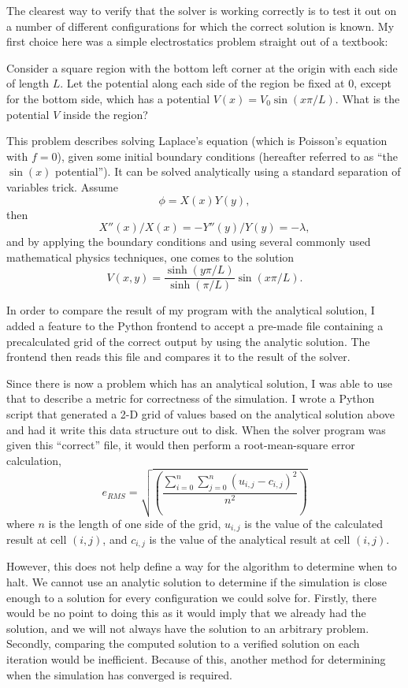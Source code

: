 The clearest way to verify that the solver is working correctly is to test it out on a number of different configurations
for which the correct solution is known. My first choice here was a simple electrostatics problem straight out of a textbook\cite{griffiths}:
\begin{addmargin}[2em]{2em}%
	Consider a square region with the bottom left corner at the origin with each side of length $L$. Let the potential
	along each side of the region be fixed at 0, except for the bottom side, which has a potential $V(x) = V_0 \sin(x \pi / L)$.
	What is the potential $V$ inside the region?
\end{addmargin}
This problem describes solving Laplace's equation (which is Poisson's equation with $f=0$), given some initial boundary conditions (hereafter referred to as ``the $\sin(x)$ potential'').
It can be solved analytically using a standard separation of variables trick\cite{boas}. Assume
$$\phi = X(x) Y(y),$$
then
$$X''(x)/X(x) = -Y''(y)/Y(y) = -\lambda,$$
and by applying the boundary conditions and using several commonly used mathematical physics techniques, one comes to the solution\cite{griffiths}
$$V(x,y) = \frac{\sinh(y \pi / L)}{\sinh(\pi / L)} \sin(x \pi / L).$$

In order to compare the result of my program with the analytical solution, I added a feature to the Python frontend
to accept a pre-made file containing a precalculated grid of the correct output by using the analytic solution. The
frontend then reads this file and compares it to the result of the solver.

Since there is now a problem which has an analytical solution, I was able to use that to describe a metric for
correctness of the simulation. I wrote a Python script that generated a 2-D grid of values based on the analytical
solution above and had it write this data structure out to disk. When the solver program was given this ``correct''
file, it would then perform a root-mean-square error calculation,
$$e_{RMS} = \sqrt{\left(\frac{\sum_{i=0}^{n} \sum_{j=0}^{n} (u_{i,j} - c_{i,j})^2}{n^2}\right)}$$
where $n$ is the length of one side of the grid, $u_{i,j}$ is the value of the calculated result at cell $(i,j)$, and
$c_{i, j}$ is the value of the analytical result at cell $(i, j)$.



However, this does not help define a way for the algorithm to determine when to halt. We cannot use an analytic solution
to determine if the simulation is close enough to a solution for every configuration we could solve for. Firstly, there
would be no point to doing this as it would imply that we already had the solution, and we will not always have the
solution to an arbitrary problem. Secondly, comparing the computed solution to a verified solution on each iteration would
be inefficient. Because of this, another method for determining when the simulation has converged is required.

